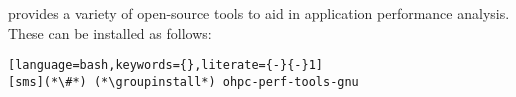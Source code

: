 \OHPC{} provides a variety of open-source tools to aid in application 
performance analysis. These can be installed as follows:

\begin{lstlisting}[language=bash,keywords={},literate={-}{-}1]
[sms](*\#*) (*\groupinstall*) ohpc-perf-tools-gnu
\end{lstlisting}


